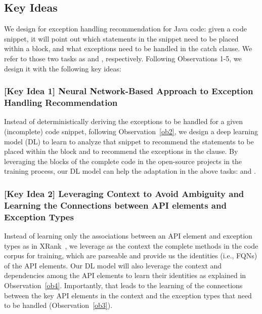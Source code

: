 \subsection{Key Ideas}
\label{key:sec}

\noindent We design {\tool} for exception handling recommendation for
Java code: given a code snippet, it will point out which statements in
the snippet need to be placed within a  block, and
what exceptions need to be handled in the catch clause. We refer to
those two tasks as {\xstate} and {\xtype}, respectively. Following
Observations 1-5, we design it with the following key ideas:

\subsubsection{{\bf [Key Idea 1] Neural Network-Based Approach to Exception Handling Recommendation}}
Instead of deterministically deriving the exceptions to be handled for
a given (incomplete) code snippet, following Observation~\ref{ob2}, we
design a deep learning model (DL) to learn to analyze that snippet to
recommend the statements to be placed within the 
block and to recommend the exceptions in the  clause.  By
leveraging the  blocks of the complete code in the
open-source projects in the training process, our DL model can help
the adaptation in the above tasks: {\xstate} and {\xtype}.


\vspace{2pt}
\subsubsection{{\bf [Key Idea 2] Leveraging Context to Avoid
Ambiguity and Learning the Connections between API elements and
Exception Types}} Instead of learning only the associations between an
API element and exception types as in XRank~\cite{xrank-fse20}, we
leverage as the context the complete methods in the code corpus for
training, which are parseable and provide us the identities (i.e.,
FQNs) of the API elements. Our DL model will also leverage the context
and dependencies among the API elements to learn their identities as
explained in Observation~\ref{ob4}. Importantly, that leads to the
learning of the connections between the key API elements in the
context and the exception types that need to be handled
(Observation~\ref{ob3}).

